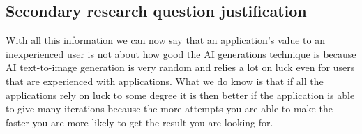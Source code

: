 \documentclass[]{report}
\begin{document}
	
	\subsection{Secondary research question justification}
	
	With all this information we can now say that an application's value to an inexperienced user is not about how good the AI generations technique is because AI text-to-image generation is very random and relies a lot on luck even for users that are experienced with applications. What we do know is that if all the applications rely on luck to some degree it is then better if the application is able to give many iterations because the more attempts you are able to make the faster you are more likely to get the result you are looking for. 
	
	
	
	
\end{document}
